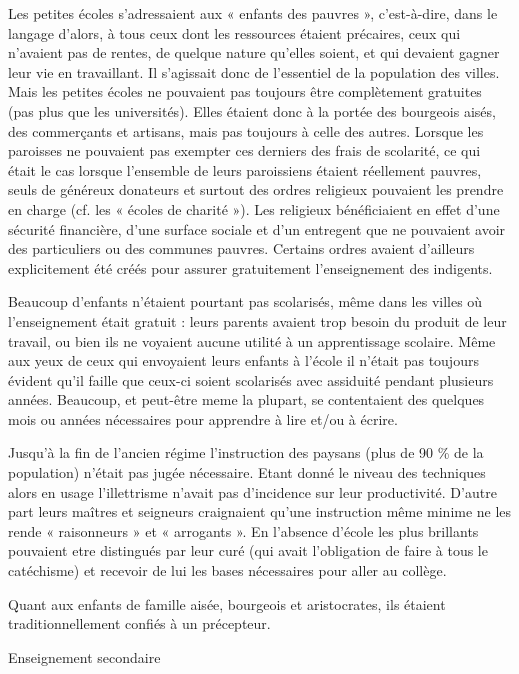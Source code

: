  Les petites écoles s'adressaient aux « enfants des pauvres », c'est-à-dire, dans le langage d'alors, à tous ceux dont les ressources étaient précaires, ceux qui n'avaient pas de rentes, de quelque nature qu'elles soient, et qui devaient gagner leur vie en travaillant. Il s'agissait donc de l'essentiel de la population des villes. Mais les petites écoles ne pouvaient pas toujours être complètement gratuites (pas plus que les universités). Elles étaient donc à la portée des bourgeois aisés, des commerçants et artisans, mais pas toujours à celle des autres. Lorsque les paroisses ne pouvaient pas exempter ces derniers des frais de scolarité, ce qui était le cas lorsque l'ensemble de leurs paroissiens étaient réellement pauvres, seuls de généreux donateurs et surtout des ordres religieux pouvaient les prendre en charge (cf.  les « écoles de charité »). Les religieux bénéficiaient en effet d'une sécurité financière, d'une surface sociale et d'un entregent que ne pouvaient avoir des particuliers ou des communes pauvres. Certains ordres avaient d'ailleurs explicitement été créés pour assurer gratuitement l'enseignement des indigents.

Beaucoup d'enfants n'étaient pourtant pas scolarisés, même dans les villes où l'enseignement était gratuit : leurs parents avaient trop besoin du produit de leur travail, ou bien ils ne voyaient aucune utilité à un apprentissage scolaire. Même aux yeux de ceux qui envoyaient leurs enfants à l'école il n'était pas toujours évident qu'il faille que ceux-ci soient scolarisés avec assiduité pendant plusieurs années. Beaucoup, et peut-être meme la plupart, se contentaient des quelques mois ou années nécessaires pour apprendre à lire et/ou à écrire. 



 Jusqu'à la fin de l'ancien régime l'instruction des paysans (plus de 90 \% de la population) n'était pas jugée nécessaire. Etant donné le niveau des techniques alors en usage l'illettrisme n'avait pas d'incidence sur leur productivité. D'autre part leurs maîtres et seigneurs craignaient qu'une instruction même minime ne les rende « raisonneurs » et « arrogants ». En l'absence d'école les plus brillants pouvaient etre distingués par leur curé (qui avait l'obligation de faire à tous le catéchisme) et recevoir de lui les bases nécessaires pour aller au collège.

Quant aux enfants de famille aisée, bourgeois et aristocrates, ils étaient traditionnellement confiés à un précepteur.  

Enseignement secondaire 

